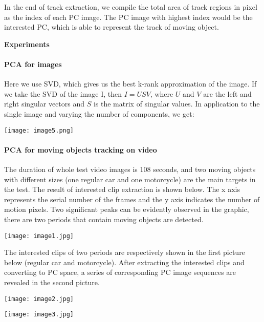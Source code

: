 \documentclass[a4paper,12pt]{article}
\begin{document}
In the end of track extraction, we compile the total area of track regions in pixel as the index of each PC image. The PC image with highest index would be the interested PC, which is able to represent the track of moving object. 


\newpage
\begin{center}
{\bf Experiments}
\end{center}

\paragraph{PCA for images}

Here we use SVD, which gives us the best k-rank approximation of the image. If we take the SVD of the image I, then $I=U S V$, where $U$ and $V$ are the left and right singular vectors and $S$ is the matrix of singular values.
In application to the single image and varying the number of components, we get:

\begin{center}
\texttt{[image: image5.png]}
\end{center}

\paragraph{PCA for moving objects tracking on video}

The duration of whole test video images is 108 seconds, and two moving
objects with different sizes (one regular car and one motorcycle) are the main targets in the test. The result of interested clip extraction is shown below. The x axis represents the serial number of the frames and the y axis indicates the number of motion pixels. Two significant peaks can be evidently observed in the graphic, there are two periods that contain moving objects are detected.
\begin{center}
\texttt{[image: image1.jpg]}
\end{center}

The interested clips of two periods are respectively shown in the first picture below (regular car and motorcycle). After extracting the interested clips and converting to PC space, a series of corresponding PC image sequences are revealed in the second picture. 

\begin{center}
\texttt{[image: image2.jpg]}
\end{center}

\begin{center}
\texttt{[image: image3.jpg]}
\end{center}
\end{document}
